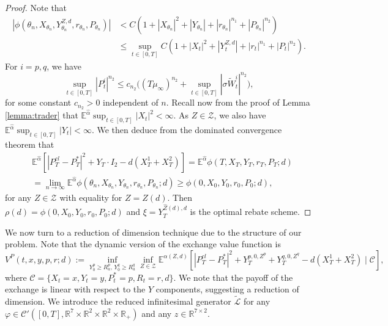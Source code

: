 \documentclass[12pt]{article}
\begin{document}
\begin{proof}
Note that
\begin{align*}
|\phi(\theta_n,X_{\theta_n},Y^{Z,d}_{\theta_n}, r_{\theta_n},P_{\theta_n})| &< C(1+ |X_{\theta_n}|^{2}+|Y_{\theta_n}|+|r_{\theta_n}|^{n_1}+|P_{\theta_n}|^{n_2})\\
&\leq \sup_{t \in [0,T]} C(1+ |X_t|^{2}+|Y^{Z,d}_t|+|r_t|^{n_1}+|P_t|^{n_2}).\end{align*} For $i = p,q$, we have \[ \sup_{t \in [0,T]} |P^i_t|^{n_2} \leq c
_{n_2} \Big((T\mu_\infty)^{n_2}+  \sup_{t\in [0,T]} |\sigma \tilde W^i_t|^{n_2}\Big) ,\] for some constant $c_{n_2}>0$ independent of $n$. Recall now from the proof of Lemma \ref{lemma:trader} that $\mathbb{E}^{\hat\alpha} \sup_{t \in [0,T]} |X_t|^{2} < \infty$. As $Z \in \mathcal{Z}$, we also have $\mathbb{E}^{\hat\alpha} \sup_{t \in [0,T]} |Y_t| < \infty$. We then deduce from the dominated convergence theorem that  \begin{align*}
&\mathbb{E}^{\hat\alpha} [|P^{cl}_T - P_T^{*}|^2 + Y_T \cdot I_2 - d(X_T^1 + X_T^2)]= \mathbb{E}^{\hat\alpha} \phi(T,X_T,Y_T, r_T,P_T;d)\\
&= \lim_{n \to \infty} \mathbb{E}^{\hat\alpha} \phi(\theta_n,X_{\theta_n},Y_{\theta_n}, r_{\theta_n},P_{\theta_n};d) \geq \phi(0,X_0,Y_0,r_0,P_0;d),\end{align*} for any $Z\in \mathcal Z$ with equality for $Z=\hat Z(d)$. Then $\rho(d) = \phi(0,X_0,Y_0,r_0,P_0;d)$ and $\xi=Y_T^{\hat Z(d),d}$ is the optimal rebate scheme.
\end{proof}
We now turn to a reduction of dimension technique due to the structure of our problem. Note that the dynamic version of the exchange value function is
\begin{equation*}
        V^P(t, x, y, p, r; d) := \inf_{Y^{p}_0 \ge R^p_a, \, Y^{q}_0 \ge R^q_a} \inf_{Z\in \mathcal Z} \mathbb{E}^{\alpha(Z,d)} \left[ \left| P^{cl}_T - P^*_T \right|^2 + Y_T^{p,0,Z^p}+Y_T^{q,0,Z^q} - d (X^1_T + X^2_T) \mid \mathcal{C} \right],
    \end{equation*}
    where $\mathcal{C} = \{X_t = x, Y_t = y, P^*_t = p, R_t = r, d\}$. We note that the payoff of the exchange is linear with respect to the $Y$ components, suggesting a reduction of dimension. We introduce the reduced infinitesimal generator $\tilde{\mathcal L}$ for any $\varphi\in \mathcal C'([0,T],\mathbb R^7\times \mathbb R^2\times \mathbb R^2\times  \mathbb R_+) $ and any $z\in \mathbb R^{7\times 2}$.
\end{document}
